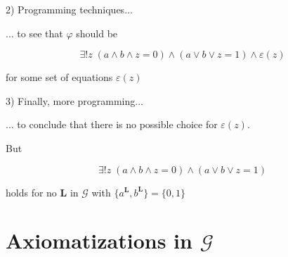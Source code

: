 \documentclass[12pt,handout]{beamer}
\begin{document}
\begin{frame}

2) Programming techniques...

\pause
\bigskip

... to see that $\varphi$ should be

\[ \exists ! z \; (a \wedge b \wedge z = 0) \wedge (a \vee b \vee z = 1) \wedge \varepsilon(z) \]

\bigskip

for some set of equations $\varepsilon(z)$

\end{frame}

\begin{frame}
 
3) Finally, more programming...

\pause
\bigskip

... to conclude that there is no possible choice for $\varepsilon(z)$.

\bigskip

\bigskip

\pause

But

\[ \exists ! z \; (a \wedge b \wedge z = 0) \wedge (a \vee b \vee z = 1) \]

\pause

holds for no $\mathbf{L}$ in $\mathcal{\mathcal{G}}$ with $\{a^{\mathbf{L}},b^{\mathbf{L}}\} = \{0,1\}$


\end{frame}






\section{Axiomatizations in $\mathcal{G}$}
\end{document}
